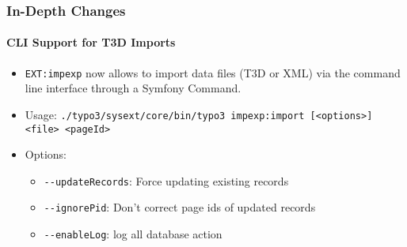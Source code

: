 \begin{frame}[fragile]
	\frametitle{In-Depth Changes}
	\framesubtitle{CLI Support for T3D Imports}

	\begin{itemize}
		\item \texttt{EXT:impexp} now allows to import data files (T3D or XML) via the command line
			interface through a Symfony Command.

		\item Usage:\newline
			\smaller
				\texttt{./typo3/sysext/core/bin/typo3 impexp:import [<options>] <file> <pageId>}
			\normalsize

		\item Options:
			\begin{itemize}
				\item \texttt{-}\texttt{-updateRecords}: Force updating existing records
				\item \texttt{-}\texttt{-ignorePid}: Don't correct page ids of updated records
				\item \texttt{-}\texttt{-enableLog}: log all database action
			\end{itemize}

	\end{itemize}

\end{frame}


